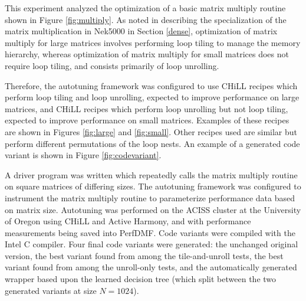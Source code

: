 \documentclass[msthesis,justified,copyright,final,numbers,sort&compress,
gsmodern,amstex,natbib]{uothesis}
\begin{document}
This experiment analyzed the optimization of a basic matrix multiply routine shown in Figure \ref{fig:multiply}. As noted in describing the specialization of the matrix multiplication in Nek5000 \cite{nek5000} in Section \ref{dense}, optimization of matrix multiply for large matrices involves performing loop tiling to manage the memory hierarchy, whereas optimization of matrix multiply for small matrices does not require loop tiling, and consists primarily of loop unrolling. 

Therefore, the autotuning framework was configured to use CHiLL recipes which perform loop tiling and loop unrolling, expected to improve performance on large matrices, and CHiLL recipes which perform loop unrolling but not loop tiling, expected to improve performance on small matrices. Examples of these recipes are shown in Figures \ref{fig:large} and \ref{fig:small}. Other recipes used are similar but perform different permutations of the loop nests. An example of a generated code variant is shown in Figure \ref{fig:codevariant}.

A driver program was written which repeatedly calls the matrix multiply routine on square matrices of differing sizes. The autotuning framework was configured to instrument the matrix multiply routine to parameterize performance data based on matrix size. Autotuning was performed on the ACISS cluster at the University of Oregon using CHiLL and Active Harmony, and with performance measurements being saved into PerfDMF. Code variants were compiled with the Intel C compiler. Four final code variants were generated: the unchanged original version, the best variant found from among the tile-and-unroll tests, the best variant found from among the unroll-only tests, and the automatically generated wrapper based upon the learned decision tree (which split between the two generated variants at size $N = 1024$). 
\end{document}
